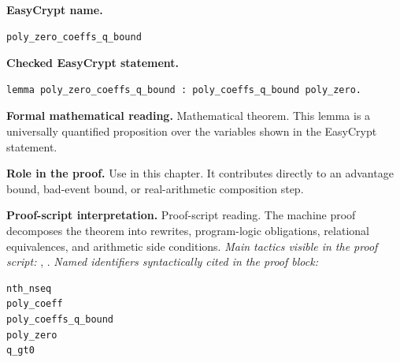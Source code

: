 \begin{formaltheorem}
\noindent\textbf{EasyCrypt name.}
\begin{lstlisting}[language=EasyCrypt,basicstyle=\ttfamily\scriptsize]
poly_zero_coeffs_q_bound
\end{lstlisting}
\noindent\textbf{Checked EasyCrypt statement.}
\begin{lstlisting}[language=EasyCrypt,basicstyle=\ttfamily\scriptsize]
lemma poly_zero_coeffs_q_bound : poly_coeffs_q_bound poly_zero.
\end{lstlisting}
\noindent\textbf{Formal mathematical reading.}
Mathematical theorem. This lemma is a universally quantified proposition over the variables shown in the EasyCrypt statement.

\noindent\textbf{Role in the proof.}
Use in this chapter. It contributes directly to an advantage bound, bad-event bound, or real-arithmetic composition step.

\noindent\textbf{Proof-script interpretation.}
Proof-script reading. The machine proof decomposes the theorem into rewrites, program-logic obligations, relational equivalences, and arithmetic side conditions.
\emph{Main tactics visible in the proof script:} , .
\emph{Named identifiers syntactically cited in the proof block:}
\begin{lstlisting}[language=EasyCrypt,basicstyle=\ttfamily\scriptsize]
nth_nseq
poly_coeff
poly_coeffs_q_bound
poly_zero
q_gt0
\end{lstlisting}

\end{formaltheorem}

